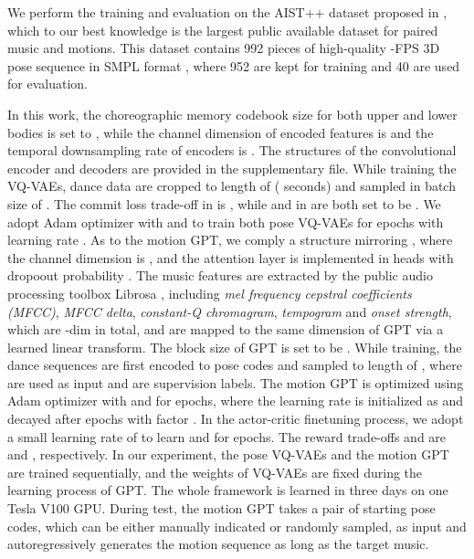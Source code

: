We perform the training and evaluation on the AIST++ dataset proposed in \cite{Li2021LearnTD}, which to our best knowledge is the largest public available dataset for paired music and motions. 
This dataset contains 992 pieces of high-quality -FPS 3D pose sequence in SMPL format \cite{SMPL:2015}, where 952 are kept for training and 40 are used for evaluation.


In this work, the choreographic memory codebook size  for both upper and lower bodies is set to , while the channel dimension  of encoded features is  and the temporal downsampling rate  of encoders is .
The structures of the convolutional encoder and decoders are provided in the supplementary file.
While training the VQ-VAEs,  dance data are cropped to length of  ( seconds)  and sampled in batch size of .
The commit loss trade-off  in  is , while   and  in  are both set to be .
We adopt Adam optimizer \cite{kingma2014adam} with  and  to train both pose VQ-VAEs for  epochs with learning rate .
As to the motion GPT, we comply a structure mirroring \cite{mingpt}, where the channel dimension is , and the attention layer is implemented in  heads with  dropoout probability .
The music features are extracted by the public audio processing toolbox Librosa \cite{jin2017towards}, including \emph{mel frequency cepstral
coefficients (MFCC)}, \emph{MFCC delta}, \emph{constant-Q chromagram}, \emph{tempogram} and \emph{onset strength}, which are -dim in total, and are mapped to the same dimension of GPT via a learned linear transform.
The block size  of GPT is set to be . 
While training, the dance sequences are first encoded to pose codes  and sampled to length of , where  are used as input and  are supervision labels.
The motion GPT is optimized using Adam optimizer with  and  for  epochs, where the learning rate is initialized as  and decayed after  epochs with factor .
In the actor-critic finetuning process, we adopt a small learning rate of  to learn  and  for  epochs.
The reward trade-offs  and  are  and , respectively.
In our experiment, the pose VQ-VAEs and the motion GPT are trained sequentially, and the weights of VQ-VAEs are fixed during the learning process of GPT.
The whole framework is learned in three days on one Tesla V100 GPU.
During test, the motion GPT takes a pair of starting pose codes, which can be either manually indicated or randomly sampled, as input and autoregressively generates the motion sequence as long as the target music.

